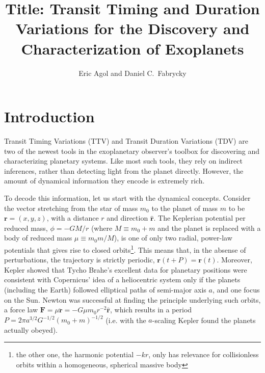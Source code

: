 \documentclass[graybox,natbib,nosecnum]{svmult}
\begin{document}
\title*{Title: Transit Timing and Duration Variations for the Discovery and Characterization of Exoplanets}
\author{Eric Agol and Daniel C.\ Fabrycky}
%
%
\maketitle



\section{Introduction}

Transit Timing Variations (TTV) and Transit Duration Variations (TDV) are two of the newest tools in the exoplanetary observer's toolbox for discovering and characterizing planetary systems. Like most such tools, they rely on indirect inferences, rather than detecting light from the planet directly.  However, the amount of dynamical information they encode is extremely rich. 

To decode this information, let us start with the dynamical concepts.  Consider the vector stretching from the star of mass $m_0$ to the planet of mass $m$ to be $\mathbf{r}=(x,y,z)$, with a distance $r$ and direction $\mathbf{\hat r}$.  The Keplerian potential per reduced mass, $\phi=-GM/r$ (where $M \equiv m_0 + m$ and the planet is replaced with a body of reduced mass $\mu \equiv m_0 m /M$), is one of only two radial, power-law potentials that gives rise to closed orbits\footnote{the other one, the harmonic potential $-kr$, only has relevance for collisionless orbits within a homogeneous, spherical massive body}.  This means that, in the absense of perturbations, the trajectory is strictly periodic, $\mathbf{r}(t+P) = \mathbf{r}(t)$.  Moreover, Kepler showed that Tycho Brahe's excellent data for planetary positions were consistent with Copernicus' idea of a heliocentric system only if the planets (including the Earth) followed elliptical paths of semi-major axis $a$, and one focus on the Sun. Newton was successful at finding the principle underlying such orbits, a force law $\mathbf{F} = \mu \mathbf{\ddot r} =-G \mu m_0 r^{-2} \mathbf{\hat r}$, which results in a period $P = 2 \pi a^{3/2} G^{-1/2} (m_0 + m)^{-1/2}$ (i.e. with the $a$-scaling Kepler found the planets actually obeyed).
\end{document}
